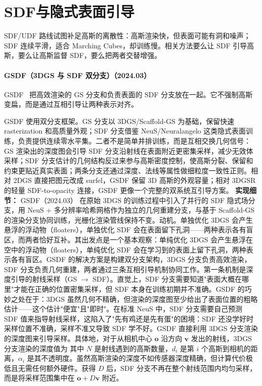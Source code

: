 \section{SDF与隐式表面引导}

SDF/UDF 路线试图补足高斯的离散性：高斯渲染快，但表面可能有洞和噪声；SDF 连续平滑，适合 Marching Cubes，却训练慢。相关方法要么让 SDF 引导高斯，要么让高斯监督 SDF，要么把两者交替增强。


\paragraph{GSDF（3DGS 与 SDF 双分支）（2024.03）}
GSDF~\cite{2403_16964} 把高效渲染的 GS 分支和负责表面的 SDF 分支放在一起。它不强制高斯变扁，而是通过互相引导让两种表示对齐。

GSDF 使用双分支框架。GS 分支以 3DGS/Scaffold-GS 为基础，保留快速 rasterization 和高质量外观；SDF 分支借鉴 NeuS/Neuralangelo 这类隐式表面训练，负责提供连续零水平集。二者不是简单并排训练，而是互相交换几何信号：GS 渲染出的深度图会引导 SDF 分支沿射线在表面附近更密集采样，减少无效体采样；SDF 分支估计的几何结构反过来参与高斯密度控制，使高斯分裂、保留和约束更贴近真实表面；两条分支还通过深度、法线等属性做细粒度一致性正则。相对 2DGS 直接把图元改成 surfel，GSDF 保留 3D 高斯的外观容量；相对 3DGSR 的轻量 SDF-to-opacity 连接，GSDF 更像一个完整的双系统互引导方案。
\textbf{实现细节：} GSDF（2024.03） 在原始 3DGS 的训练过程中引入了并行的 SDF 隐式场分支，用 NeuS + 多分辨率哈希网格作为独立的几何重建分支，与基于 Scaffold-GS 的渲染分支协同训练，光栅化渲染管线保持不变。动机。单独优化 3DGS 会产生悬浮的浮动物（floaters），单独优化 SDF 会在表面留下孔洞——两种表示各有盲区，而两者恰好互补。其出发点是一个基本观察：单纯优化 3DGS 会产生悬浮在空中的浮动物（floaters），单纯优化 SDF 会在学习到的表面上留下孔洞，两种表示各有盲区。GSDF 的解决方案是构建双分支架构，3DGS 分支负责高效渲染，SDF 分支负责几何重建，两者通过三条互相引导机制协同工作。第一条机制是深度引导的射线采样（GS $\to$ SDF）。直觉上，SDF 分支需要知道"表面大概在哪里"才能在正确的位置密集采样，但 SDF 本身在训练初期并不准确。GSDF 的巧妙之处在于：3DGS 虽然几何不精确，但渲染的深度图至少给出了表面位置的粗略估计——这个估计"便宜"且"即时"。在标准 NeuS 中，SDF 分支需要自己预测 SDF 值来指导射线采样，这陷入了"先有鸡还是先有蛋"的困境：SDF 还没学好时采样位置不准确，采样不准又导致 SDF 学不好。GSDF 直接利用 3DGS 分支渲染的深度图来引导采样。具体地，对于从相机中心 $\mathbf{o}$ 沿方向 $\mathbf{v}$ 发出的射线，3DGS 分支渲染的深度值为 其中 $N$ 是射线遇到的高斯数量，$d_i$ 是第 $i$ 个高斯到相机的距离，$\alpha_i$ 是其不透明度。虽然高斯渲染的深度不如传感器深度精确，但计算代价极低且无需任何额外硬件。获得 $D$ 后，SDF 分支不再在整个射线范围内均匀采样，而是将采样范围集中在 $\mathbf{o} + D\mathbf{v}$ 附近。
